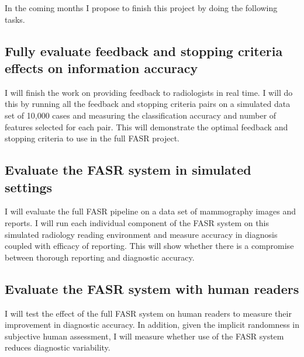 In the coming months I propose to finish this project by doing the following tasks.

\subsection{Fully evaluate feedback and stopping criteria effects on information accuracy}
I will finish the work on providing feedback to radiologists in real time. I will do this by running all the feedback and stopping criteria pairs on a simulated data set of 10,000 cases and measuring the classification accuracy and number of features selected for each pair. This will demonstrate the optimal feedback and stopping criteria to use in the full FASR project.

\subsection{Evaluate the FASR system in simulated settings}
I will evaluate the full FASR pipeline on a data set of mammography images and reports. I will run each individual component of the FASR system on this simulated radiology reading environment and measure accuracy in diagnosis coupled with efficacy of reporting. This will show whether there is a compromise between thorough reporting and diagnostic accuracy.

\subsection{Evaluate the FASR system with human readers}
I will test the effect of the full FASR system on human readers to measure their improvement in diagnostic accuracy. In addition, given the implicit randomness in subjective human assessment, I will measure whether use of the FASR system reduces diagnostic variability.